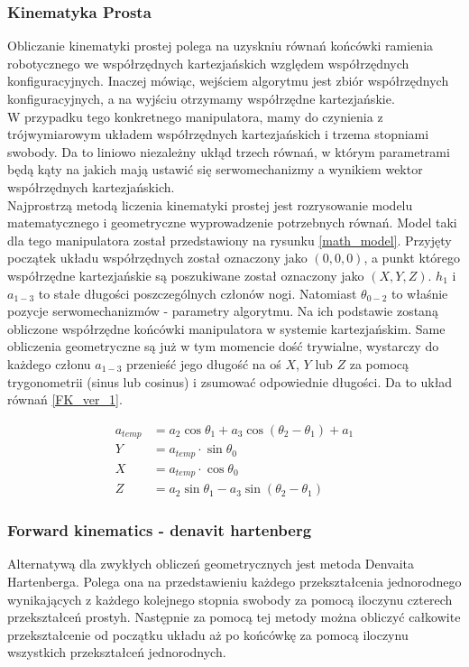 \documentclass[a4paper,13pt]{article}
\begin{document}
\subsubsection{Kinematyka Prosta}
Obliczanie kinematyki prostej polega na uzyskniu równań końcówki ramienia robotycznego we współrzędnych kartezjańskich względem współrzędnych konfiguracyjnych. Inaczej mówiąc, wejściem algorytmu jest zbiór współrzędnych konfiguracyjnych, a na wyjściu otrzymamy współrzędne kartezjańskie.\cite{robot_manipulators}\\

W przypadku tego konkretnego manipulatora, mamy do czynienia z trójwymiarowym układem współrzędnych kartezjańskich i trzema stopniami swobody. Da to liniowo niezależny ukłąd trzech równań, w którym parametrami będą kąty na jakich mają ustawić się serwomechanizmy a wynikiem wektor współrzędnych kartezjańskich.\\

Najprostrzą metodą liczenia kinematyki prostej jest rozrysowanie modelu matematycznego i geometryczne wyprowadzenie potrzebnych równań. Model taki dla tego manipulatora został przedstawiony na rysunku \ref{math_model}. Przyjęty początek układu współrzędnych został oznaczony jako $(0, 0, 0)$, a punkt którego współrzędne kartezjańskie są poszukiwane został oznaczony jako $(X, Y, Z)$. $h_1$ i $a_{1-3}$ to stałe długości poszczególnych członów nogi. Natomiast $\theta_{0-2}$ to właśnie pozycje serwomechanizmów - parametry algorytmu. Na ich podstawie zostaną obliczone współrzędne końcówki manipulatora w systemie kartezjańskim. Same obliczenia geometryczne są już w tym momencie dość trywialne, wystarczy do każdego członu $a_{1-3}$ przenieść jego długość na oś $X$, $Y$ lub $Z$ za pomocą trygonometrii (sinus lub cosinus) i zsumować odpowiednie długości. Da to układ równań \ref{FK_ver_1}.

\begin{equation} \label{FK_ver_1}
\begin{split}
a_{temp} &= a_2 \cos{\theta_1} + a_3 \cos{\left(\theta_2 - \theta_1\right)} + a_1\\
Y &= a_{temp} \cdot \sin{\theta_0}\\
X &= a_{temp} \cdot \cos{\theta_0}\\
Z &= a_2 \sin{\theta_1} - a_3 \sin{\left(\theta_2 - \theta_1\right)}
\end{split}
\end{equation}

\subsubsection{Forward kinematics - denavit hartenberg \cite{DH_AA_article}}
Alternatywą dla zwykłych obliczeń geometrycznych jest metoda Denvaita Hartenberga. Polega ona na przedstawieniu każdego przekształcenia jednorodnego wynikających z każdego kolejnego stopnia swobody za pomocą iloczynu czterech przekształceń prostyh. Następnie za pomocą tej metody można obliczyć całkowite przekształcenie od początku układu aż po końcówkę za pomocą iloczynu wszystkich przekształceń jednorodnych. \cite{DH_wpaszke_wyklad}
\end{document}
